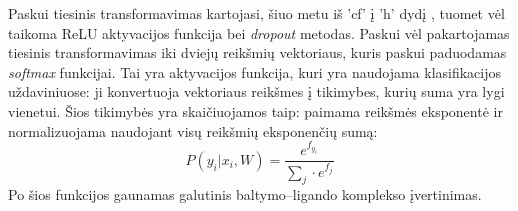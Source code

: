 Paskui tiesinis transformavimas kartojasi, šiuo metu iš 'cf' į 'h' dydį , tuomet vėl taikoma ReLU aktyvacijos funkcija bei \emph{dropout} metodas. Paskui vėl pakartojamas tiesinis transformavimas iki dviejų reikšmių vektoriaus, kuris paskui paduodamas \emph{softmax} funkcijai. Tai yra aktyvacijos funkcija, kuri yra naudojama klasifikacijos uždaviniuose: ji konvertuoja vektoriaus reikšmes į tikimybes, kurių suma yra lygi vienetui. Šios tikimybės yra skaičiuojamos taip: paimama reikšmės eksponentė ir normalizuojama naudojant visų reikšmių eksponenčių sumą:
\begin{equation}
P(y_{i} | x_{i}, W) = \frac{e^{f_{y_i}}}{\sum _j\cdot e^{f_j}}
\end{equation}
Po šios funkcijos gaunamas galutinis baltymo--ligando komplekso įvertinimas.





